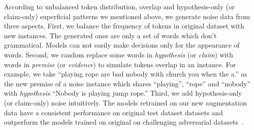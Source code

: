 According to unbalanced token distribution, overlap 
and hypothesis-only (or claim-only) superficial patterns we 
mentioned above, we generate noise data from three aspects. 
First, we balance the frequency of tokens in original dataset with new instances.
The generated ones are only a set of words which don't grammatical. 
Models can not easily make decisions only for the appearance of words. 
Second, we random replace some words in \textit{hypothesis} (or \textit{claim}) 
with words in \textit{premise} (or \textit{evidence}) 
to simulate tokens overlap in an instance. For example, we take ``playing rope are bad nobody with church 
you when the a.'' as the new premise of a noise instance which shares ``playing'', ``rope'' and ``nobody'' 
with \textit{hypothesis} ``Nobody is playing jump rope.''
Third, we add hypothesis-only (or claim-only) noise intuitively. 
The models retrained on our new augmentation data have a consistent performance on 
original test dataset datasets and outperform the models
trained on original on challenging adversarial datasets~. 











